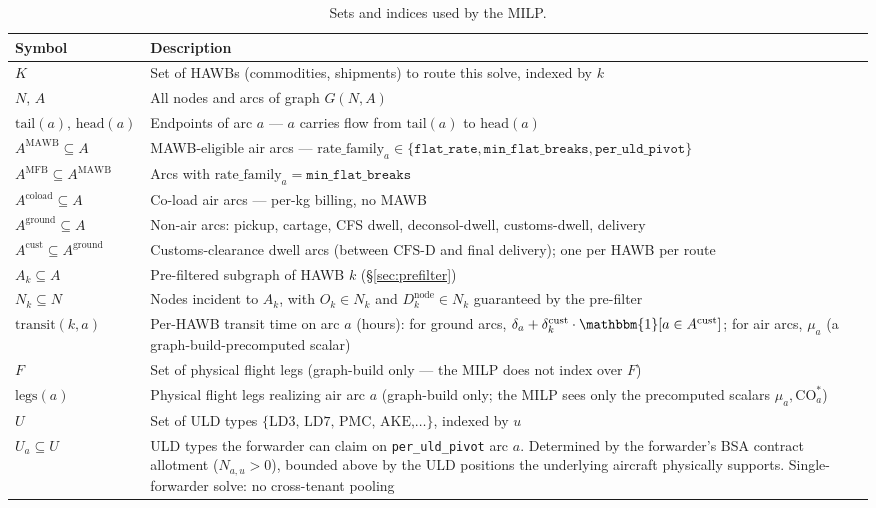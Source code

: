 \documentclass[11pt,a4paper]{article}
\theoremstyle{definition}
\begin{document}
\begin{table}[H]
\centering
\caption{Sets and indices used by the MILP.}
\label{tab:sets-indices}
\begin{tabular}{lp{11.5cm}}
\toprule
Symbol & Description \\
\midrule
$K$ & Set of HAWBs (commodities, shipments) to route this solve, indexed by $k$ \\
$N,\, A$ & All nodes and arcs of graph $G(N,A)$ \\
$\text{tail}(a),\, \text{head}(a)$ & Endpoints of arc $a$ --- $a$ carries flow from $\text{tail}(a)$ to $\text{head}(a)$ \\
$A^{\text{MAWB}} \subseteq A$ & MAWB-eligible air arcs --- $\text{rate\_family}_a \in \{\texttt{flat\_rate}, \texttt{min\_flat\_breaks}, \texttt{per\_uld\_pivot}\}$ \\
$A^{\text{MFB}} \subseteq A^{\text{MAWB}}$ & Arcs with $\text{rate\_family}_a = \texttt{min\_flat\_breaks}$ \\
$A^{\text{coload}} \subseteq A$ & Co-load air arcs --- per-kg billing, no MAWB \\
$A^{\text{ground}} \subseteq A$ & Non-air arcs: pickup, cartage, CFS dwell, deconsol-dwell, customs-dwell, delivery \\
$A^{\text{cust}} \subseteq A^{\text{ground}}$ & Customs-clearance dwell arcs (between $\text{CFS-D}$ and final delivery); one per HAWB per route \\
$A_k \subseteq A$ & Pre-filtered subgraph of HAWB $k$ (\S\ref{sec:prefilter}) \\
$N_k \subseteq N$ & Nodes incident to $A_k$, with $O_k \in N_k$ and $D_k^{\text{node}} \in N_k$ guaranteed by the pre-filter \\
$\text{transit}(k, a)$ & Per-HAWB transit time on arc $a$ (hours): for ground arcs, $\delta_a + \delta^{\text{cust}}_k \cdot \mathbbm{1}[a \in A^{\text{cust}}]$; for air arcs, $\mu_a$ (a graph-build-precomputed scalar) \\
$F$ & Set of physical flight legs (graph-build only --- the MILP does not index over $F$) \\
$\text{legs}(a)$ & Physical flight legs realizing air arc $a$ (graph-build only; the MILP sees only the precomputed scalars $\mu_a, \text{CO}_a^*$) \\
$U$ & Set of ULD types $\{\text{LD3, LD7, PMC, AKE,} \ldots\}$, indexed by $u$ \\
$U_a \subseteq U$ & ULD types the forwarder can claim on \texttt{per\_uld\_pivot} arc $a$. Determined by the forwarder's BSA contract allotment ($N_{a,u} > 0$), bounded above by the ULD positions the underlying aircraft physically supports. Single-forwarder solve: no cross-tenant pooling \\

\end{tabular}
\end{table}
\end{document}
